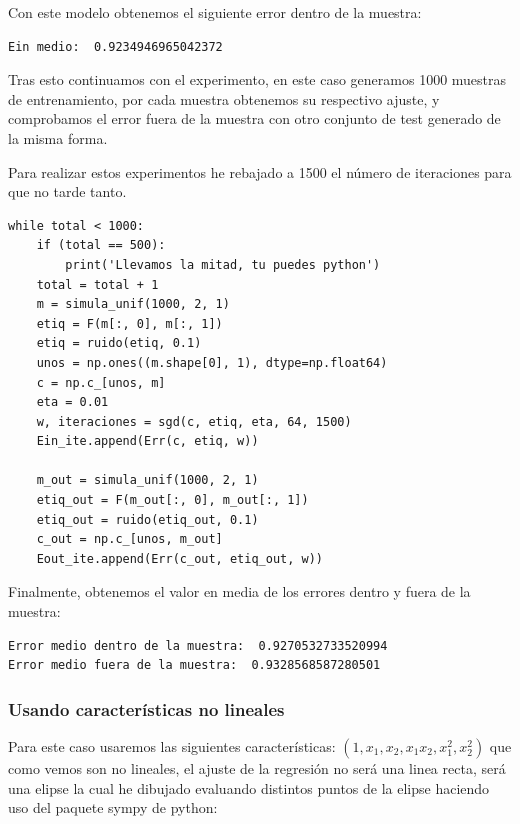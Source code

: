 \documentclass[12pt, spanish]{article}
\begin{document}
Con este modelo obtenemos el siguiente error dentro de la muestra:

\begin{lstlisting}
Ein medio:  0.9234946965042372
\end{lstlisting}

Tras esto continuamos con el experimento, en este caso generamos 1000 muestras de entrenamiento, por cada muestra obtenemos su respectivo ajuste, y comprobamos el error fuera de la muestra con otro conjunto de test generado de la misma forma.

Para realizar estos experimentos he rebajado a 1500 el número de iteraciones para que no tarde tanto.

\newpage

\begin{lstlisting}
while total < 1000:
	if (total == 500):
		print('Llevamos la mitad, tu puedes python')
	total = total + 1
	m = simula_unif(1000, 2, 1)
	etiq = F(m[:, 0], m[:, 1])
	etiq = ruido(etiq, 0.1)
	unos = np.ones((m.shape[0], 1), dtype=np.float64)
	c = np.c_[unos, m]
	eta = 0.01
	w, iteraciones = sgd(c, etiq, eta, 64, 1500)
	Ein_ite.append(Err(c, etiq, w))

	m_out = simula_unif(1000, 2, 1)
	etiq_out = F(m_out[:, 0], m_out[:, 1])
	etiq_out = ruido(etiq_out, 0.1)
	c_out = np.c_[unos, m_out]
	Eout_ite.append(Err(c_out, etiq_out, w))
\end{lstlisting}

Finalmente, obtenemos el valor en media de los errores dentro y fuera de la muestra:

\begin{lstlisting}
Error medio dentro de la muestra:  0.9270532733520994
Error medio fuera de la muestra:  0.9328568587280501
\end{lstlisting}

\newpage

\subsubsection{Usando características no lineales}



Para este caso usaremos las siguientes características: $(1, x_1, x_2, x_1x_2, x_1^2, x_2^2)$ que como vemos son no lineales, el ajuste de la regresión no será una linea recta, será una elipse la cual he dibujado evaluando distintos puntos de la elipse haciendo uso del paquete sympy de python:
\end{document}
